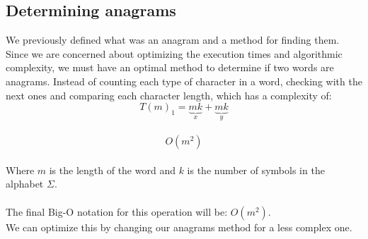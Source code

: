 \documentclass{article}
\begin{document}
	\subsection{Determining anagrams}
	We previously defined what was an anagram and a method for
	finding them. Since we are concerned about optimizing the execution
	times and algorithmic complexity, we must have an optimal method
	to determine if two words are anagrams. Instead of counting each
	type of character in a word, checking with the next ones and comparing
	each character length, which has a complexity of:
	\[
	T(m)_1 = \underbrace{mk}_x + \underbrace{mk}_y
	\]
	\\
	\[
	O(m^2)
	\]
	\\
	Where $m$ is the length of the word and $k$ is the number of symbols in
	the alphabet $\Sigma$.
	\\
	\\
	The final Big-O notation for this operation will be: $O(m^2)$.
	\\
	We can optimize this by changing our anagrams method for a
	less complex one.
\end{document}
